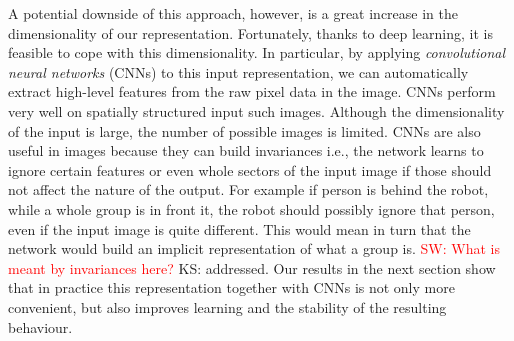 \documentclass[letterpaper, 10 pt, conference]{ieeeconf}
\newcommand{\sw}[1]{\textcolor{red}{SW: #1}}
\newcommand{\ks}[1]{\textcolor{mypurp}{KS: #1}}
\begin{document}
A potential downside of this approach, however, is a great increase in the dimensionality of our representation.  Fortunately, thanks to deep learning, it is feasible to cope with this dimensionality.  In particular, by applying \emph{convolutional neural networks} (CNNs) to this input representation, we can automatically extract high-level features from the raw pixel data in the image. CNNs perform very well on spatially structured input such images.  Although the  dimensionality of the input is large, the number of possible images is limited. CNNs are also useful in images because they can build invariances i.e., the network learns to ignore certain features or even whole sectors of the input image if those should not affect the nature of the output. For example if person is behind the robot, while a whole group is in front it, the robot should possibly ignore that person, even if the input image is quite different. This would mean in turn that the network would build an implicit representation of what a group is. \sw{What is meant by invariances here?} \ks{addressed}. Our results in the next section show that in practice this representation together with CNNs is not only more convenient, but also improves learning and the stability of the resulting behaviour.
\end{document}
